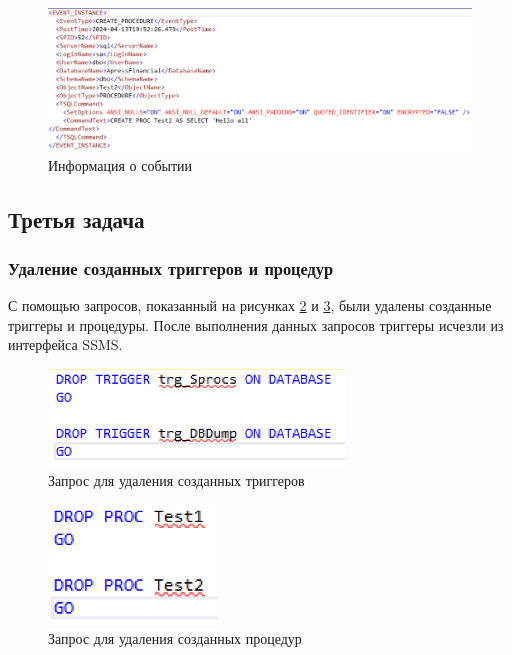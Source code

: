 \documentclass[a4paper, 14pt]{extarticle}
\begin{document}
\begin{figure}[H]
  \centering
  \includegraphics[width=\textwidth]{images/task-2/8.png}
  \caption{Информация о событии}
  \label{fig:task-2-8}
\end{figure}

\subsection{Третья задача}

\subsubsection{Удаление созданных триггеров и процедур}

С помощью запросов, показанный на рисунках \ref{fig:task-3-1} и
\ref{fig:task-3-2}, были удалены созданные триггеры и процедуры. После
выполнения данных запросов триггеры исчезли из интерфейса SSMS.

\begin{figure}[H]
  \centering
  \includegraphics[width=0.7\textwidth]{images/task-3/1.png}
  \caption{Запрос для удаления созданных триггеров}
  \label{fig:task-3-1}
\end{figure}

\begin{figure}[H]
  \centering
  \includegraphics[width=0.4\textwidth]{images/task-3/2.png}
  \caption{Запрос для удаления созданных процедур}
  \label{fig:task-3-2}
\end{figure}
\end{document}
